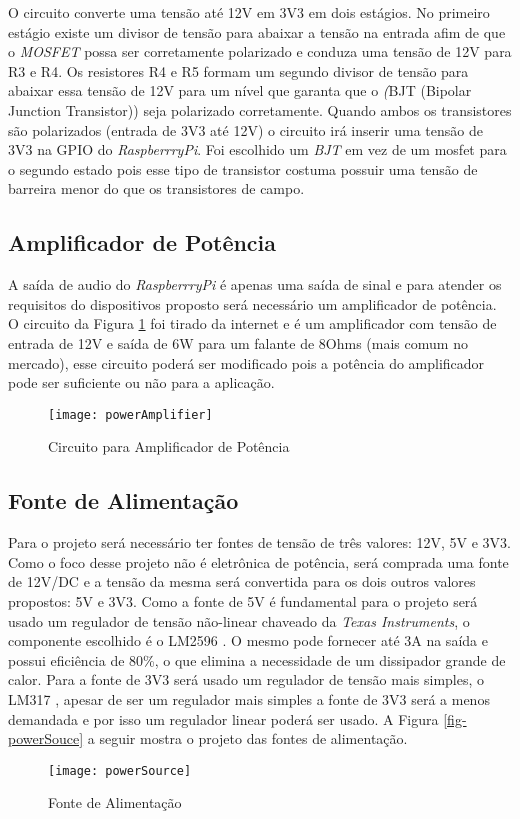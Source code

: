 	O circuito converte uma tensão até 12V em 3V3 em dois estágios. No primeiro estágio existe um divisor de tensão para abaixar a tensão na entrada afim de que o \textit{MOSFET} possa ser corretamente polarizado e conduza uma tensão de 12V para R3 e R4. Os resistores R4 e R5 formam um segundo divisor de tensão para abaixar essa tensão de 12V para um nível que garanta que o \textit(BJT (Bipolar Junction Transistor)) seja polarizado corretamente. Quando ambos os transistores são polarizados (entrada de 3V3 até 12V) o circuito irá inserir uma tensão de 3V3 na GPIO do \textit{RaspberrryPi}. Foi escolhido um \textit{BJT} em vez de um mosfet para o segundo estado pois esse tipo de transistor costuma possuir uma tensão de barreira menor do que os transistores de campo.
	
	
\subsection{Amplificador de Potência}

	A saída de audio do \textit{RaspberrryPi} é apenas uma saída de sinal e para atender os requisitos do dispositivos proposto será necessário um amplificador de potência. O circuito da Figura \ref{fig-powerAmplifier} foi tirado da internet \cite{powerAmplifier} e é um amplificador com tensão de entrada de 12V e saída de 6W para um falante de 8Ohms (mais comum no mercado), esse circuito poderá ser modificado pois a potência do amplificador pode ser suficiente ou não para a aplicação.

	\begin{figure}[htbp]
		\centering
			\texttt{[image: powerAmplifier]}
		\caption{Circuito para Amplificador de Potência}
		\label{fig-powerAmplifier}
	\end{figure}

\subsection{Fonte de Alimentação}

	Para o projeto será necessário ter fontes de tensão de três valores: 12V, 5V e 3V3. Como o foco desse projeto não é eletrônica de potência, será comprada uma fonte de 12V/DC e a tensão da mesma será convertida para os dois outros valores propostos: 5V e 3V3. Como a fonte de 5V é fundamental para o projeto será usado um regulador de tensão não-linear chaveado da \textit{Texas Instruments}, o componente escolhido é o LM2596 \cite{lm2596}. O mesmo pode fornecer até 3A na saída e possui eficiência de 80\%, o que elimina a necessidade de um dissipador grande de calor. Para a fonte de 3V3 será usado um regulador de tensão mais simples, o LM317 \cite{lm317}, apesar de ser um regulador mais simples a fonte de 3V3 será a menos demandada e por isso um regulador linear poderá ser usado. A Figura \ref{fig-powerSouce} a seguir mostra o projeto das fontes de alimentação.
	
	\begin{figure}[htbp]
		\centering
			\texttt{[image: powerSource]}
		\caption{Fonte de Alimentação}
		\label{fig-powerSource}
	\end{figure}
